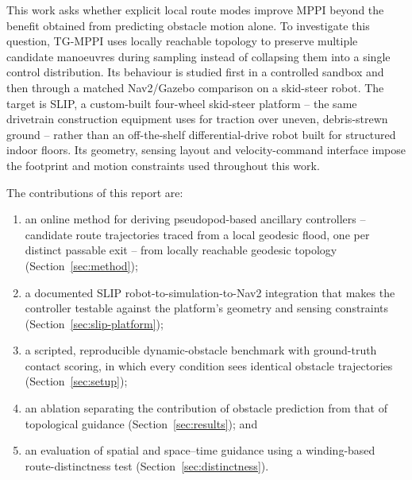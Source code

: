 \documentclass[journal]{IEEEtran}
\begin{document}
This work asks whether explicit local route modes improve MPPI beyond the
benefit obtained from predicting obstacle motion alone. To investigate this
question, TG-MPPI uses locally reachable topology to preserve multiple
candidate manoeuvres during sampling instead of collapsing them into a single
control distribution. Its behaviour is studied first in a controlled sandbox
and then through a matched Nav2/Gazebo comparison on a skid-steer robot.
The target is SLIP, a custom-built four-wheel skid-steer platform -- the same
drivetrain construction equipment uses for traction over uneven, debris-strewn
ground -- rather than an off-the-shelf differential-drive robot built for
structured indoor floors. Its geometry, sensing layout and velocity-command
interface impose the footprint and motion constraints used throughout this
work.

The contributions of this report are:
\begin{enumerate}
  \item an online method for deriving pseudopod-based ancillary controllers --
        candidate route trajectories traced from a local geodesic flood, one
        per distinct passable exit -- from locally reachable geodesic
        topology (Section~\ref{sec:method});
  \item a documented SLIP robot-to-simulation-to-Nav2 integration that makes
        the controller testable against the platform's geometry and sensing
        constraints (Section~\ref{sec:slip-platform});
  \item a scripted, reproducible dynamic-obstacle benchmark with ground-truth
        contact scoring, in which every condition sees identical obstacle
        trajectories (Section~\ref{sec:setup});
  \item an ablation separating the contribution of obstacle prediction from
        that of topological guidance (Section~\ref{sec:results}); and
  \item an evaluation of spatial and space--time guidance using a
        winding-based route-distinctness test (Section~\ref{sec:distinctness}).
\end{enumerate}
\end{document}
